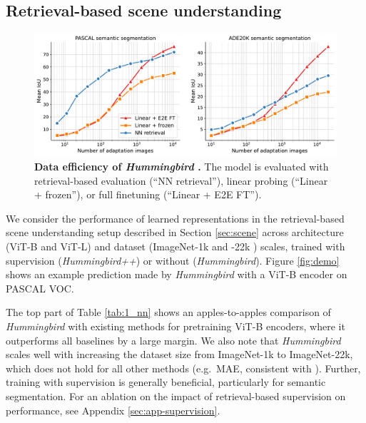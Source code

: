 \documentclass{article}
\newcommand{\ours}{\textit{Hummingbird} }
\begin{document}
\subsection{Retrieval-based scene understanding} \label{sec:eval_nn}



\begin{figure}[ht]
  \begin{center}
    \includegraphics[width=1.0\textwidth]{figures/figure_data_eff.pdf}
  \end{center}
\vspace{-1em}
\caption{\textbf{Data efficiency of \ours\hspace{-0.25em}.} The model is evaluated with retrieval-based evaluation (``NN retrieval''), linear probing (``Linear + frozen''), or full finetuning (``Linear + E2E FT'').}
\label{fig:dataeff}
\end{figure}


We consider the performance of learned representations in the retrieval-based scene understanding setup described in Section \ref{sec:scene} across architecture (ViT-B and ViT-L) and dataset (ImageNet-1k and -22k \cite{imagenetILSVRC15}) scales, trained with supervision (\textit{Hummingbird++}) or without (\textit{Hummingbird}). Figure \ref{fig:demo} shows an example prediction made by \ours with a ViT-B encoder on PASCAL VOC. 

The top part of Table \ref{tab:1_nn} shows an apples-to-apples comparison of \ours with existing methods for pretraining ViT-B encoders, where it outperforms all baselines by a large margin. We also note that \ours scales well with increasing the dataset size from ImageNet-1k to ImageNet-22k, which does not hold for all other methods (e.g.\ MAE, consistent with \cite{oquab2023dinov2}). Further, training with supervision is generally beneficial, particularly for semantic segmentation. For an ablation on the impact of retrieval-based supervision on performance, see Appendix \ref{sec:app-supervision}.
\end{document}
